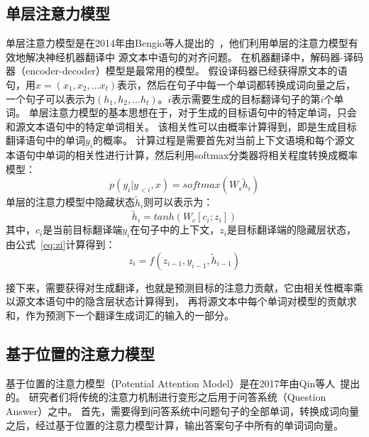 \subsection{单层注意力模型}
单层注意力模型是在2014年由Bengio等人提出的~，他们利用单层的注意力模型有效地解决神经机器翻译中
源文本中语句的对齐问题。
在机器翻译中，解码器-译码器（encoder-decoder）模型是最常用的模型。
假设译码器已经获得原文本的语句，用${x=\left ( x_{1},x_{2},...x_{t} \right )}$表示，然后在句子中每一个单词都转换成词向量之后，
一个句子可以表示为${\left ( h_{1},h_{2},...h_{t} \right )}$。${i}$表示需要生成的目标翻译句子的第${i}$个单词。
单层注意力模型的基本思想在于，对于生成的目标语句中的特定单词，只会和源文本语句中的特定单词相关。
该相关性可以由概率计算得到，即是生成目标翻译语句中的单词${y_{i}}$的概率。
计算过程是需要首先对当前上下文语境和每个源文本语句中单词的相关性进行计算，然后利用softmax分类器将相关程度转换成概率模型：
\begin{equation}
    p\left ( y_{i}|y_{<i},x \right )=softmax\left ( W_{s}\widetilde{h}_{i} \right )
\end{equation}
单层的注意力模型中隐藏状态${\widetilde{h}_{i}}$则可以表示为：
\begin{equation}
    \widetilde{h}_{i}=tanh\left ( W_{c}\left [ c_{i};z_{i} \right ] \right )
\end{equation}
其中，${c_{i}}$是当前目标翻译端${y_{i}}$在句子中的上下文，${z_{i}}$是目标翻译端的隐藏层状态，由公式~\ref{eq:zi}计算得到：
\begin{equation}
    z_{i}=f\left ( z_{i-1},y_{i-1},\widetilde{h}_{i-1} \right )
    \label{eq:zi}
\end{equation}

接下来，需要获得对生成翻译，也就是预测目标的注意力贡献，它由相关性概率乘以源文本语句中的隐含层状态计算得到，
再将源文本中每个单词对模型的贡献求和，作为预测下一个翻译生成词汇的输入的一部分。

\subsection{基于位置的注意力模型}

基于位置的注意力模型（Potential Attention Model）是在2017年由Qin等人~提出的。
研究者们将传统的注意力机制进行变形之后用于问答系统（Question Answer）之中。
首先，需要得到问答系统中问题句子的全部单词，转换成词向量之后，经过基于位置的注意力模型计算，输出答案句子中所有的单词词向量。

